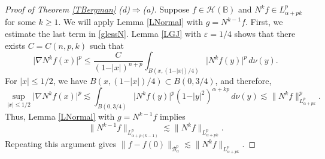 \documentclass{amsart}
\theoremstyle{definition}
\theoremstyle{remark}
\begin{document}
\begin{proof}[Proof of Theorem \ref{TBergman} (d)$\Rightarrow$(a)]
Suppose $f\in\mathcal H(\mathbb B)$ and $N^k f\in L^p_{\alpha+pk}$ for some $k\ge 1$.
We will apply Lemma \ref{LNormal} with $g=N^{k-1}f$.
First, we estimate the last term in \eqref{glessN}.
Lemma \ref{LGJ} with $\varepsilon=1/4$ shows that there
exists $C=C(n,p,k)$ such that
\begin{equation*}
\vert\nabla N^k f(x)\vert^p
\le \frac{C}{(1-\vert x\vert)^{n+p}}
\int_{B(x,(1-\vert x\vert)/4)} \vert N^k f(y)\vert^p\, d\nu(y).
\end{equation*}
For $\vert x\vert\le 1/2$, we have
$B(x,(1-\vert x\vert)/4)\subset B(0,3/4)$, and therefore,
\begin{equation*}
\sup_{\vert x\vert\le 1/2}\vert\nabla N^{k}f(x)\vert^p
\lesssim \int_{B(0,3/4)}
\vert N^k f(y)\vert^p (1-\vert y\vert^2)^{\alpha+kp}\, d\nu(y)
\lesssim \|N^k f\|^p_{L^p_{\alpha+pk}}.
\end{equation*}
Thus, Lemma \ref{LNormal} with $g=N^{k-1}f$ implies
\begin{equation*}
\|N^{k-1}f\|_{L^p_{\alpha+p(k-1)}}
\lesssim \|N^{k}f\|_{L^p_{\alpha+pk}}.
\end{equation*}
Repeating this argument gives
$\|f-f(0)\|_{\mathcal B^p_\alpha}\lesssim \|N^k f\|_{L^p_{\alpha+pk}}$.
\end{proof}
\end{document}
